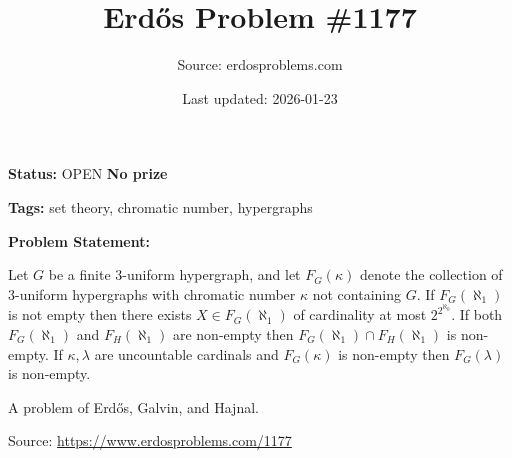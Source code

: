 \documentclass{article}
\title{Erd\H{o}s Problem \#1177}
\date{Last updated: 2026-01-23}
\author{Source: erdosproblems.com}
\begin{document}
\maketitle

\noindent\textbf{Status:} OPEN \quad \textbf{No prize}

\noindent\textbf{Tags:} set theory, chromatic number, hypergraphs

\medskip

\noindent\textbf{Problem Statement:}

Let $G$ be a finite $3$-uniform hypergraph, and let $F_G(\kappa)$ denote the collection of $3$-uniform hypergraphs with chromatic number $\kappa$ not containing $G$. If $F_G(\aleph_1)$ is not empty then there exists $X\in F_G(\aleph_1)$ of cardinality at most $2^{2^{\aleph_0}}$. If both $F_G(\aleph_1)$ and $F_H(\aleph_1)$ are non-empty then $F_G(\aleph_1)\cap F_H(\aleph_1)$ is non-empty. If $\kappa,\lambda$ are uncountable cardinals and $F_G(\kappa)$ is non-empty then $F_G(\lambda)$ is non-empty.




A problem of Erd\H{o}s, Galvin, and Hajnal.


\bigskip
\noindent\small{Source: \url{https://www.erdosproblems.com/1177}}
\end{document}
